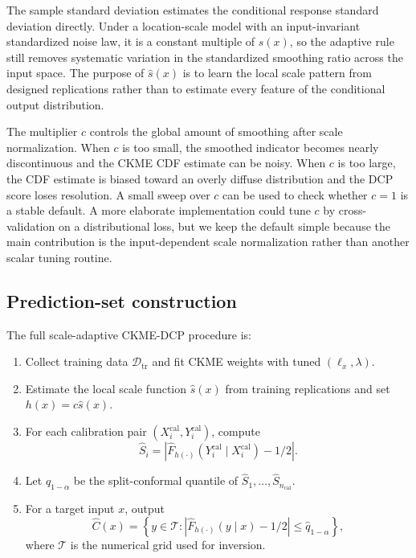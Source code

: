 \documentclass[11pt]{article}
\newcommand{\Dcal}{\mathcal D}
\newcommand{\Tcal}{\mathcal T}
\newcommand{\abs}[1]{\left\lvert #1 \right\rvert}
\begin{document}
The sample standard deviation estimates the conditional response standard deviation directly. Under a location-scale model with an input-invariant standardized noise law, it is a constant multiple of \(s(x)\), so the adaptive rule still removes systematic variation in the standardized smoothing ratio across the input space. The purpose of \(\widehat s(x)\) is to learn the local scale pattern from designed replications rather than to estimate every feature of the conditional output distribution.

The multiplier \(c\) controls the global amount of smoothing after scale normalization. When \(c\) is too small, the smoothed indicator becomes nearly discontinuous and the CKME CDF estimate can be noisy. When \(c\) is too large, the CDF estimate is biased toward an overly diffuse distribution and the DCP score loses resolution. A small sweep over \(c\) can be used to check whether \(c=1\) is a stable default. A more elaborate implementation could tune \(c\) by cross-validation on a distributional loss, but we keep the default simple because the main contribution is the input-dependent scale normalization rather than another scalar tuning routine.

\subsection{Prediction-set construction}

The full scale-adaptive CKME-DCP procedure is:
\begin{enumerate}[leftmargin=1.7em]
  \item Collect training data \(\Dcal_{\mathrm{tr}}\) and fit CKME weights with tuned \((\ell_x,\lambda)\).
  \item Estimate the local scale function \(\widehat s(x)\) from training replications and set \(h(x)=c\widehat s(x)\).
  \item For each calibration pair \((X_i^{\mathrm{cal}},Y_i^{\mathrm{cal}})\), compute
  \[
    \widehat S_i=\abs{\widehat F_{h(\cdot)}(Y_i^{\mathrm{cal}}\mid X_i^{\mathrm{cal}})-1/2}.
  \]
  \item Let \(\widehat q_{1-\alpha}\) be the split-conformal quantile of \(\widehat S_1,\ldots,\widehat S_{n_{\mathrm{cal}}}\).
  \item For a target input \(x\), output
  \[
    \widehat C(x)=\left\{y\in\Tcal:
    \abs{\widehat F_{h(\cdot)}(y\mid x)-1/2}\le \widehat q_{1-\alpha}
    \right\},
  \]
  where \(\Tcal\) is the numerical grid used for inversion.
\end{enumerate}
\end{document}
